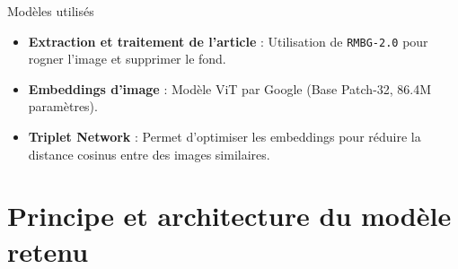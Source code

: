 \documentclass{beamer}
\begin{document}
\begin{frame}{Modèles utilisés}
    \begin{itemize}
        \item \textbf{Extraction et traitement de l'article} : Utilisation de \texttt{RMBG-2.0} pour rogner l'image et supprimer le fond. 
        \item \textbf{Embeddings d'image} : Modèle ViT par Google (Base Patch-32, 86.4M paramètres).
        \item \textbf{Triplet Network} : Permet d'optimiser les embeddings pour réduire la distance cosinus entre des images similaires.
    \end{itemize}
    \end{frame}

\section{Principe et architecture du modèle retenu}
\end{document}
